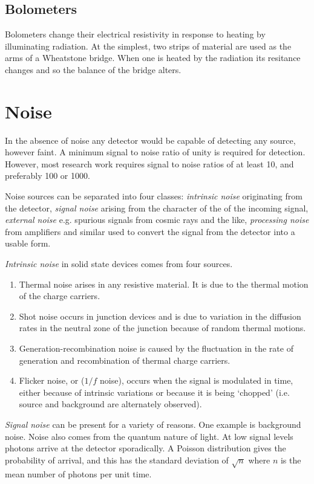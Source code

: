 \subsection{Bolometers}
Bolometers change their electrical
resistivity in response to heating by illuminating radiation. At the
simplest, two strips of material are used as the arms of a Wheatstone
bridge. When one is heated by the radiation its resitance changes and
so the balance of the bridge alters. 

\section{Noise}

In the absence of noise any detector would be capable of detecting any source,
however faint. A minimum signal to noise ratio of unity is required for 
detection. However, most research work requires signal to noise ratios of
at least 10, and preferably 100 or 1000. 

Noise sources can be separated into four classes: {\it intrinsic noise} 
originating from the detector, {\it signal noise} arising from the character
of the of the incoming signal, {\it external noise} e.g. spurious signals
from cosmic rays and the like, {\it processing noise} from amplifiers and
similar used to convert the signal from the detector into a usable form.

{\it Intrinsic noise} in solid state devices comes from four sources.
\begin{enumerate}
\item Thermal noise arises in any resistive material. It is due to the thermal
motion of the charge carriers. 
\item Shot noise occurs in junction devices and is due to variation in 
the diffusion rates in the neutral zone of the junction because of random
thermal motions. 
\item Generation-recombination noise is caused by the fluctuation in the
rate of generation and recombination of thermal charge carriers. 
\item Flicker noise, or ($1/f$ noise), occurs when the signal is modulated
in time, either because of intrinsic variations or because it is being
`chopped' (i.e. source and background are alternately observed). 
\end{enumerate}

{\it Signal noise} can be present for a variety of reasons. One example is
background noise. Noise also comes from the quantum nature of light. At
low signal levels photons arrive at the detector sporadically. A Poisson
distribution gives the probability of arrival, and this has the standard
deviation of $\sqrt{n}$ where $n$ is the mean number of photons per unit
time. 


